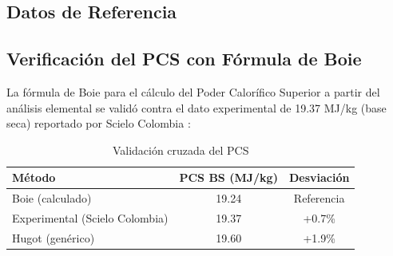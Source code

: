 \begin{appendices}
\section{Datos de Referencia}

\subsection{Verificación del PCS con Fórmula de Boie}

La fórmula de Boie para el cálculo del Poder Calorífico Superior a partir del análisis elemental se validó contra el dato experimental de 19.37 MJ/kg (base seca) reportado por Scielo Colombia \cite{scielo_bagasse}:

\begin{table}[H]
	\centering
	\caption{Validación cruzada del PCS}
	\label{tab:pcs_validation}
	\begin{tabular}{@{}lcc@{}}
		\toprule
		\textbf{Método} & \textbf{PCS BS (MJ/kg)} & \textbf{Desviación} \\
		\midrule
		Boie (calculado) & 19.24 & Referencia \\
		Experimental (Scielo Colombia) & 19.37 & +0.7\% \\
		Hugot (genérico) & 19.60 & +1.9\% \\
		\bottomrule
	\end{tabular}
\end{table}

\end{appendices}
